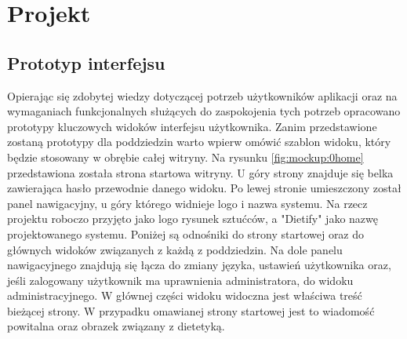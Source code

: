 \chapter{Projekt}\label{ch:project}

%
%
%
%
%
%

\section{Prototyp interfejsu}\label{sec:mockups}

Opierając się zdobytej wiedzy dotyczącej potrzeb użytkowników aplikacji
oraz na wymaganiach funkcjonalnych służących do zaspokojenia tych potrzeb
opracowano prototypy kluczowych widoków interfejsu użytkownika.
Zanim przedstawione zostaną prototypy dla poddziedzin warto wpierw omówić szablon widoku, który będzie stosowany w obrębie całej witryny.
Na rysunku \ref{fig:mockup:0home} przedstawiona została strona startowa witryny.
U góry strony znajduje się belka zawierająca hasło przewodnie danego widoku.
Po lewej stronie umieszczony został panel nawigacyjny, u góry którego widnieje logo i nazwa systemu.
Na rzecz projektu roboczo przyjęto jako logo rysunek sztućców, a "Dietify" jako nazwę projektowanego systemu.
Poniżej są odnośniki do strony startowej oraz do głównych widoków związanych z każdą z poddziedzin.
Na dole panelu nawigacyjnego znajdują się łącza do zmiany języka, ustawień użytkownika oraz, jeśli zalogowany użytkownik ma uprawnienia administratora, do widoku administracyjnego.
W głównej części widoku widoczna jest właściwa treść bieżącej strony.
W przypadku omawianej strony startowej jest to wiadomość powitalna oraz obrazek związany z dietetyką.

